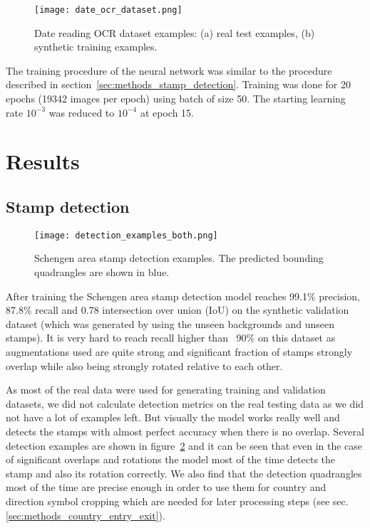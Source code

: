 \documentclass[twocolumn]{svjour3}
\begin{document}
\begin{figure}
    \centering
    \texttt{[image: date\_ocr\_dataset.png]}
    \caption{Date reading OCR dataset examples: (a) real test examples, (b) synthetic training examples.}
    \label{fig:ocr_dataset_examples}
\end{figure}

The training procedure of the neural network was similar to the procedure described in section~\ref{sec:methods_stamp_detection}. Training was done for 20 epochs (19342 images per epoch) using batch of size 50. The starting learning rate $10^{-3}$ was reduced to $10^{-4}$ at epoch 15.

\section{Results}

\subsection{Stamp detection}

\begin{figure}[tbp]
  \centering
  \texttt{[image: detection\_examples\_both.png]}
  \caption{Schengen area stamp detection examples. The predicted bounding quadrangles are shown in blue.}
  \label{fig:stamp_detection_examples}
\end{figure}

After training the Schengen area stamp detection model reaches 99.1\% precision, 87.8\% recall and 0.78 intersection over union (IoU) on the synthetic validation dataset (which was generated by using the unseen backgrounds and unseen stamps). It is very hard to reach recall higher than ~90\% on this dataset as augmentations used are quite strong and significant fraction of stamps strongly overlap while also being strongly rotated relative to each other.

As most of the real data were used for generating training and validation datasets, we did not calculate detection metrics on the real testing data as we did not have a lot of examples left. But visually the model works really well and detects the stamps with almost perfect accuracy when there is no overlap. Several detection examples are shown in figure~\ref{fig:stamp_detection_examples} and it can be seen that even in the case of significant overlaps and rotations the model most of the time detects the stamp and also its rotation correctly. We also find that the detection quadrangles most of the time are precise enough in order to use them for country and direction symbol cropping which are needed for later processing steps (see sec. \ref{sec:methods_country_entry_exit}).
\end{document}
